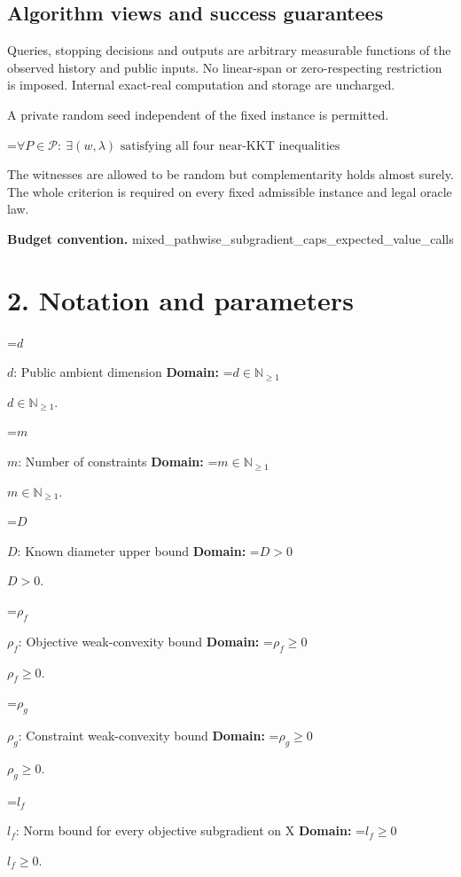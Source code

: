 \documentclass[10pt,a4paper]{article}
\newcommand{\AtlasMath}[1]{\par\begingroup\centering\setbox0=\hbox{$\displaystyle #1$}\ifdim\wd0>1.4\linewidth\typeout{ATLAS WIDE FORMULA: \the\wd0}\fi\ifdim\wd0>\linewidth\resizebox{\linewidth}{!}{\box0}\else\box0\fi\par\endgroup}
\newcommand{\AtlasInlineMath}[1]{\begingroup\setbox0=\hbox{$#1$}\ifdim\wd0>.4\linewidth\endgroup\AtlasMath{#1}\else\endgroup$#1$\fi}
\begin{document}
\subsection{Algorithm views and success guarantees}


Queries, stopping decisions and outputs are arbitrary measurable functions of the observed history and public inputs. No linear-span or zero-respecting restriction is imposed. Internal exact-real computation and storage are uncharged.



A private random seed independent of the fixed instance is permitted.




\AtlasMath{\forall P\in\mathcal P:\ \exists(w,\lambda)\text{ satisfying all four near-KKT inequalities}}




The witnesses are allowed to be random but complementarity holds almost surely. The whole criterion is required on every fixed admissible instance and legal oracle law.



\textbf{Budget convention.} mixed\_pathwise\_subgradie\allowbreak{}nt\_caps\_expected\_value\_c\allowbreak{}alls



\section{2. Notation and parameters}


\AtlasInlineMath{d}: Public ambient dimension \textbf{Domain:} \AtlasInlineMath{d\in\mathbb N_{\ge1}}.



\AtlasInlineMath{m}: Number of constraints \textbf{Domain:} \AtlasInlineMath{m\in\mathbb N_{\ge1}}.



\AtlasInlineMath{D}: Known diameter upper bound \textbf{Domain:} \AtlasInlineMath{D>0}.



\AtlasInlineMath{\rho_f}: Objective weak-convexity bound \textbf{Domain:} \AtlasInlineMath{\rho_f\ge0}.



\AtlasInlineMath{\rho_g}: Constraint weak-convexity bound \textbf{Domain:} \AtlasInlineMath{\rho_g\ge0}.



\AtlasInlineMath{l_f}: Norm bound for every objective subgradient on X \textbf{Domain:} \AtlasInlineMath{l_f\ge0}.
\end{document}
